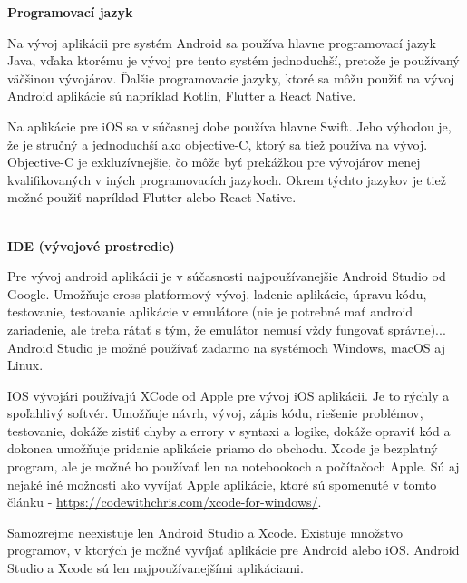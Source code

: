 \documentclass[10pt,twoside,slovak,a4paper]{article}
\begin{document}
\textbf{Programovací jazyk}

Na vývoj aplikácii pre systém Android sa používa hlavne programovací jazyk Java, vďaka ktorému je vývoj pre tento systém jednoduchší, pretože je používaný väčšinou vývojárov. Ďalšie programovacie jazyky, ktoré sa môžu použiť na vývoj Android aplikácie sú napríklad Kotlin, Flutter a React Native.

Na aplikácie pre iOS sa v súčasnej dobe používa hlavne Swift. Jeho výhodou je, že je stručný a jednoduchší ako objective-C, ktorý sa tiež používa na vývoj. Objective-C je exkluzívnejšie, čo môže byť prekážkou pre vývojárov menej kvalifikovaných v iných programovacích jazykoch. Okrem týchto jazykov je tiež možné použiť napríklad Flutter alebo React Native.


\cite{eYewated2, openxcell, W2S, appleglitz}
\\	%


\textbf{IDE (vývojové prostredie)}

Pre vývoj android aplikácii je v súčasnosti najpoužívanejšie Android Studio od Google. Umožňuje cross-platformový vývoj, ladenie aplikácie, úpravu kódu, testovanie, testovanie aplikácie v emulátore (nie je potrebné mať android zariadenie, ale treba rátať s tým, že emulátor nemusí vždy fungovať správne)... Android Studio je možné používať zadarmo na systémoch Windows, macOS aj Linux.

IOS vývojári používajú XCode od Apple pre vývoj iOS aplikácii. Je to rýchly a spoľahlivý softvér. Umožňuje návrh, vývoj, zápis kódu, riešenie problémov, testovanie, dokáže zistiť chyby a errory v syntaxi a logike, dokáže opraviť kód a dokonca umožňuje pridanie aplikácie priamo do obchodu. Xcode je bezplatný program, ale je možné ho používať len na notebookoch a počítačoch Apple. Sú aj nejaké iné možnosti ako vyvíjať Apple aplikácie, ktoré sú spomenuté v tomto článku - \url{https://codewithchris.com/xcode-for-windows/}.

\cite{eliteml, EGO, DDI}

Samozrejme neexistuje len Android Studio a Xcode. Existuje množstvo programov, v ktorých je možné vyvíjať aplikácie pre Android alebo iOS. Android Studio a Xcode sú len najpoužívanejšími aplikáciami.
\\	%
\end{document}
